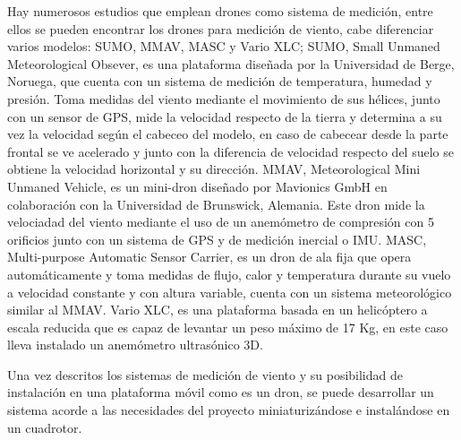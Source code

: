 Hay numerosos estudios que emplean drones como sistema de medición, entre ellos se pueden encontrar los drones para medición de viento\cite{Prudden2016}\cite{hardin2011small}\cite{MoyanoCano2013}, cabe diferenciar varios modelos: SUMO, MMAV, MASC y Vario XLC; SUMO, Small Unmaned Meteorological Obsever\cite{Reuder2009}, es una plataforma diseñada por la Universidad de Berge, Noruega, que cuenta con un sistema de medición de temperatura, humedad y presión. Toma medidas del viento mediante el movimiento de sus hélices, junto con un sensor de GPS, mide la velocidad respecto de la tierra y determina a su vez la velocidad según el cabeceo del modelo, en caso de cabecear desde la parte frontal se ve acelerado y junto con la diferencia de velocidad respecto del suelo se obtiene la velocidad horizontal y su dirección. MMAV, Meteorological Mini Unmaned Vehicle\cite{BuschmannMarcoandBangeJensandVorsmann2019}, es un mini-dron diseñado por Mavionics GmbH en colaboración con la Universidad de Brunswick, Alemania. Este dron mide la velociadad del viento mediante el uso de un anemómetro de compresión con 5 orificios junto con un sistema de GPS y de medición inercial o IMU. MASC, Multi-purpose Automatic Sensor Carrier\cite{Wildmann2014}, es un dron de ala fija que opera automáticamente y toma medidas de flujo, calor y temperatura durante su vuelo a velocidad constante y con altura variable, cuenta con un sistema meteorológico similar al MMAV. Vario XLC\cite{Xiang2016}, es una plataforma basada en un helicóptero a escala reducida que es capaz de levantar un peso máximo de 17 Kg, en este caso lleva instalado un anemómetro ultrasónico 3D.

Una vez descritos los sistemas de medición de viento y su posibilidad de instalación en una plataforma móvil como es un dron, se puede  desarrollar un sistema acorde a las necesidades del proyecto miniaturizándose e instalándose en un cuadrotor.